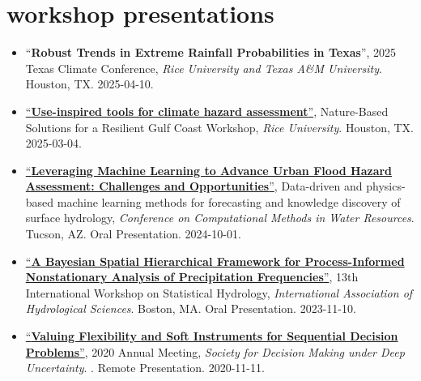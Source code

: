 \documentclass[10pt,oneside]{article}
\begin{document}
\mbox{}\vspace{-\dimexpr\baselineskip\relax}
\vspace*{-1em}
\printbibliography[type=inproceedings, heading=none]


\section{workshop presentations}

\mbox{}\vspace{-\dimexpr\baselineskip\relax}

\begin{itemize}[label={}]
  
  \item \enquote{\textbf{Robust Trends in Extreme Rainfall Probabilities in Texas}}, 2025 Texas Climate Conference,  \textit{Rice University and Texas A\&M University}. Houston, TX. 2025-04-10.
  
  \item \href{https://events.rice.edu/event/nbs-workshop#!view/all}{\enquote{\textbf{Use-inspired tools for climate hazard assessment}}}, Nature-Based Solutions for a Resilient Gulf Coast Workshop,  \textit{Rice University}. Houston, TX. 2025-03-04.
  
  \item \href{https://cmwrconference.org/wp-content/uploads/2024/09/CMWR-2024-Agenda-Full.pdf}{\enquote{\textbf{Leveraging Machine Learning to Advance Urban Flood Hazard Assessment: Challenges and Opportunities}}}, Data-driven and physics-based machine learning methods for forecasting and knowledge discovery of surface hydrology,  \textit{Conference on Computational Methods in Water Resources}. Tucson, AZ. Oral Presentation. 2024-10-01.
  
  \item \href{https://iahs.info/uploads/Commissions/ICSH/STAHY%202023%20Program%20Public.pdf}{\enquote{\textbf{A Bayesian Spatial Hierarchical Framework for Process-Informed Nonstationary Analysis of Precipitation Frequencies}}}, 13th International Workshop on Statistical Hydrology,  \textit{International Association of Hydrological Sciences}. Boston, MA. Oral Presentation. 2023-11-10.
  
  \item \href{https://2020.deepuncertainty.org/program}{\enquote{\textbf{Valuing Flexibility and Soft Instruments for Sequential Decision Problems}}}, 2020 Annual Meeting,  \textit{Society for Decision Making under Deep Uncertainty}. . Remote Presentation. 2020-11-11.
  

\end{itemize}
\end{document}

